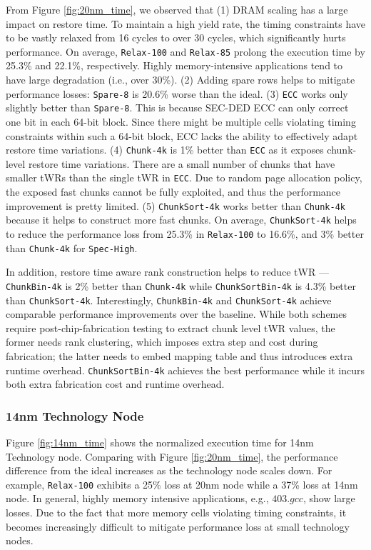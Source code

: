 From Figure \ref{fig:20nm_time}, we observed that 
(1) DRAM scaling has a large impact on restore time. To maintain a high yield rate, the timing constraints have to be vastly relaxed from 16 cycles to over 30 cycles, which significantly hurts performance. On average, {\tt Relax-100} and {\tt Relax-85} prolong the execution time by 25.3\% and 22.1\%, respectively. Highly memory-intensive applications tend to have large degradation (i.e., over 30\%). 
(2) Adding spare rows helps to mitigate performance losses: {\tt Spare-8} is 20.6\% worse than the ideal. 
(3) {\tt ECC} works only slightly better than {\tt Spare-8}. This is because SEC-DED ECC can only correct one bit in each 64-bit block. Since there  might be multiple cells violating timing constraints within such a 64-bit block, ECC lacks the ability to effectively adapt restore time variations.
(4) {\tt Chunk-4k} is 1\% better than {\tt ECC} as it exposes chunk-level restore time variations. There are a small number of chunks that have smaller tWRs than the single tWR in {\tt ECC}. Due to random page allocation policy, the exposed fast chunks cannot be fully exploited, and thus the performance improvement is pretty limited.
(5) {\tt ChunkSort-4k} works better than {\tt Chunk-4k} because it helps to construct more fast chunks. On average,
{\tt ChunkSort-4k} helps to reduce the performance loss from 25.3\% in {\tt Relax-100} to 16.6\%, and 3\% better than {\tt Chunk-4k} for {\tt Spec-High}.

In addition, restore time aware rank construction helps to reduce tWR ---  {\tt ChunkBin-4k} is 2\% better than  {\tt Chunk-4k} while  {\tt ChunkSortBin-4k} is 4.3\% better than  {\tt ChunkSort-4k}. 
Interestingly, {\tt ChunkBin-4k} and {\tt ChunkSort-4k} achieve comparable performance improvements over the baseline. While both schemes require post-chip-fabrication testing to extract chunk level tWR values, the former needs rank clustering, which imposes extra step and cost during fabrication; the latter needs to embed mapping table and thus introduces extra runtime overhead.  
{\tt ChunkSortBin-4k} achieves the best performance while it incurs both extra fabrication cost and runtime overhead. 

\subsubsection{14nm Technology Node} 
Figure \ref{fig:14nm_time} shows the normalized execution time for 14nm Technology node. 
Comparing with Figure \ref{fig:20nm_time}, the performance difference from the ideal increases as the technology node scales down. For example, {\tt Relax-100} exhibits a 25\% loss at 20nm node while a 37\% loss at 14nm node. In general, highly memory intensive applications, e.g., $403.gcc$, show large losses. Due to the fact that more memory cells violating timing constraints, it becomes increasingly difficult to mitigate performance loss at small technology nodes.

